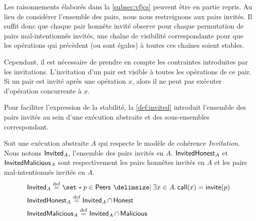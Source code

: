 Les raisonnements élaborés dans la \autoref{subsec:vfjcs} peuvent être en partie repris.
Au lieu de considérer l'ensemble des pairs, nous nous restreignons aux pairs invités.
Il suffit donc que chaque pair honnête invité observe pour chaque permutation de pairs mal-intentionnés invités, une chaîne de visibilité correspondante pour que les opérations qui précèdent (ou sont égales) à toutes ces chaînes soient stables.

Cependant, il est nécessaire de prendre en compte les contraintes introduites par les invitations.
L'invitation d'un pair est visible à toutes les opérations de ce pair.
Si un pair est invité après une opération $x$, alors il ne peut pas exécuter d'opération concurrente à $x$.

Pour faciliter l'expression de la stabilité, la \autoref{def:invited} introduit l'ensemble des pairs invités au sein d'une exécution abstraite et des sous-ensembles correspondant.

\begin{definition}[Invités]\label{def:invited}
Soit une exécution abstraite $A$ qui respecte le modèle de cohérence \emph{Invitation}.
Nous notons $\operatorname{\mathsf{Invited}}_A$, l'ensemble des pairs invités en $A$.
$\operatorname{\mathsf{InvitedHonest}}_A$ et $\operatorname{\mathsf{InvitedMalicious}}_A$ sont respectivement les pairs honnêtes invités en $A$ et les pairs mal-intentionnés invités en $A$.
\begin{align*}
&\trm{Invited}_A \defeq \set*{p \in \trm{Peers} \given \exists x \in A \qsep \trm{call}(x) = \trm{invite}(p)}\\
&\trm{InvitedHonest}_A \defeq \trm{Invited}_A \cap \trm{Honest}\\
&\trm{InvitedMalicious}_A \defeq \trm{Invited}_A \cap \trm{Malicious}
\end{align*}
\end{definition}

